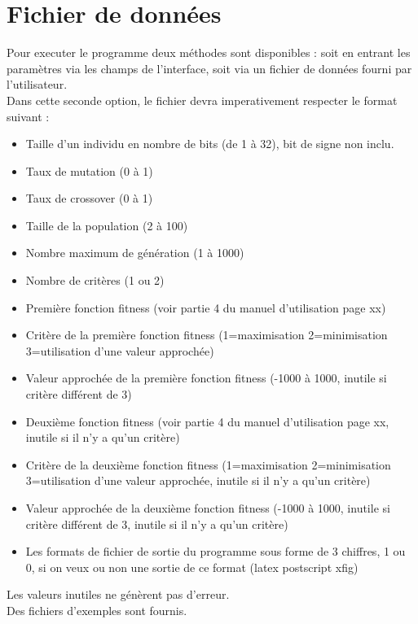 \documentclass[a4paper,11pt]{article}
\begin{document}
\section{Fichier de données}
Pour executer le programme deux méthodes sont disponibles : soit en entrant les paramètres via les champs de l'interface, soit via un fichier de données fourni par l'utilisateur.\\
Dans cette seconde option, le fichier devra imperativement respecter le format suivant : \\
\begin{itemize}
 \item Taille d'un individu en nombre de bits (de 1 à 32), bit de signe non inclu.
 \item Taux de mutation (0 à 1)
 \item Taux de crossover (0 à 1)
 \item Taille de la population (2 à 100)
 \item Nombre maximum de génération (1 à 1000)
 \item Nombre de critères (1 ou 2)
 \item Première fonction fitness (voir partie 4 du manuel d'utilisation page xx)
 \item Critère de la première fonction fitness (1=maximisation 2=minimisation 3=utilisation d'une valeur approchée)
 \item Valeur approchée de la première fonction fitness (-1000 à 1000, inutile si critère différent de 3)
 \item Deuxième fonction fitness (voir partie 4 du manuel d'utilisation page xx, inutile si il n'y a qu'un critère)
 \item Critère de la deuxième fonction fitness (1=maximisation 2=minimisation 3=utilisation d'une valeur approchée, inutile si il n'y a qu'un critère)
 \item Valeur approchée de la deuxième fonction fitness (-1000 à 1000, inutile si critère différent de 3, inutile si il n'y a qu'un critère)
 \item Les formats de fichier de sortie du programme sous forme de 3 chiffres, 1 ou 0, si on veux ou non une sortie de ce format (latex postscript xfig)
 \end{itemize}
 Les valeurs inutiles ne génèrent pas d'erreur.\\
 Des fichiers d'exemples sont fournis.\\

\newpage
\end{document}
